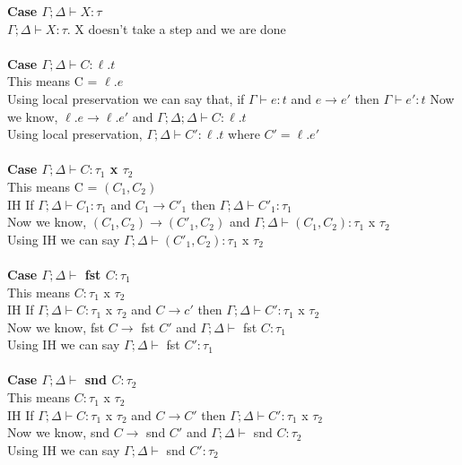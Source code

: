 \documentclass{article}
\begin{document}
\textbf{Case $\Gamma; \Delta \vdash X : \tau$}       \\ 
$\Gamma; \Delta \vdash X : \tau$. X doesn't take a step and we are done \\ \\
\textbf{Case $\Gamma; \Delta \vdash C : \ell.t$}       \\ 
This means C = $\ell.e$ \\
Using local preservation we can say that, if $\Gamma \vdash e : t$ and  $e \to e'$ then $\Gamma \vdash e' : t$
Now we know, $\ell.e \to \ell.e'$ and $\Gamma; \Delta; \Delta \vdash C : \ell.t$  \\
Using local preservation, $\Gamma;\Delta \vdash C' : \ell.t$ where $C' = \ell.e'$
\\ \\
\textbf{Case $\Gamma;\Delta \vdash C : \tau_1 $ x $ \tau_2$ } \\
This means C = $(C_1, C_2)$ \\
IH If $\Gamma; \Delta \vdash C_1 : \tau_1$ and  $C_1 \to C'_1$ then $\Gamma;\Delta \vdash C'_1 : \tau_1$ \\
Now we know, $(C_1,C_2) \to (C'_1, C_2)$ and $\Gamma; \Delta \vdash (C_1, C_2) : \tau_1$ x $\tau_2$ \\
Using IH we can say $\Gamma;\Delta \vdash (C'_1, C_2) : \tau_1$ x $ \tau_2$ \\\\
\textbf{Case $\Gamma; \Delta\vdash$ fst $C : \tau_1$ } \\
This means $C : \tau_1$ x $\tau_2$ \\
IH If $\Gamma; \Delta \vdash C : \tau_1$ x $\tau_2$ and  $C \to c'$ then $\Gamma; \Delta \vdash C' : \tau_1$ x $\tau_2$ \\
Now we know, fst $C \to$ fst $C'$ and $\Gamma;\Delta \vdash$ fst $C : \tau_1$ \\
Using IH we can say $\Gamma; \Delta \vdash$ fst $ C' : \tau_1$ \\\\
\textbf{Case $\Gamma; \Delta \vdash$ snd $C : \tau_2$ } \\
This means $C : \tau_1$ x $\tau_2$ \\
IH If $\Gamma; \Delta \vdash C : \tau_1$ x $\tau_2$ and  $C \to C'$ then $\Gamma; \Delta \vdash C' : \tau_1$ x $\tau_2$ \\
Now we know, snd $C \to$ snd $C'$ and $\Gamma; \Delta \vdash$ snd $C : \tau_2$ \\
Using IH we can say $\Gamma; \Delta \vdash$ snd $ C' : \tau_2$ \\\\
\end{document}
